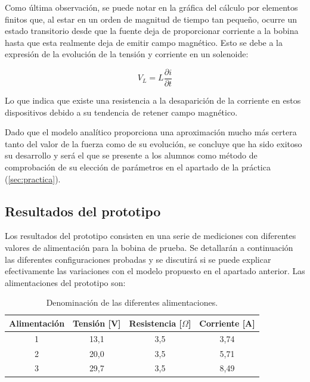 Como última observación, se puede notar en la gráfica del cálculo por elementos finitos que, al estar en un orden de magnitud de tiempo tan pequeño, ocurre un estado transitorio desde que la fuente deja de proporcionar corriente a la bobina hasta que esta realmente deja de emitir campo magnético. Esto se debe a la expresión de la evolución de la tensión y corriente en un solenoide:

\[V_L=L\frac{\partial i}{\partial t}\]

Lo que indica que existe una resistencia a la desaparición de la corriente en estos dispositivos debido a su tendencia de retener campo magnético.

Dado que el modelo analítico proporciona una aproximación mucho más certera tanto del valor de la fuerza como de su evolución, se concluye que ha sido exitoso su desarrollo y será el que se presente a los alumnos como método de comprobación de su elección de parámetros en el apartado de la práctica (\ref{sec:practica}).

\subsection{Resultados del prototipo}
\label{subsec:prototipoResults}

Los resultados del prototipo consisten en una serie de mediciones con diferentes valores de alimentación para la bobina de prueba. Se detallarán a continuación las diferentes configuraciones probadas y se discutirá si se puede explicar efectivamente las variaciones con el modelo propuesto en el apartado anterior. Las alimentaciones del prototipo son:


\begin{table}[H]
    \centering
    \setlength{\tabcolsep}{5pt}
    \renewcommand{\arraystretch}{1.2}
    \begin{tabular}{|c|c|c|c|}
        \hline
        \textbf{Alimentación} & \textbf{Tensión [V]} & \textbf{Resistencia [\(\Omega\)]} & \textbf{Corriente [A]}\\
        \hline
        1 & 13,1 & 3,5 & 3,74 \\
        2 & 20,0 & 3,5 & 5,71 \\
        3 & 29,7 & 3,5 & 8,49\\
        \hline
    \end{tabular}
    \caption{Denominación de las diferentes alimentaciones.}
    \label{tab:alimentacionesBase}
\end{table}

